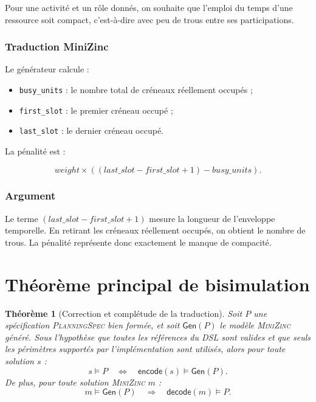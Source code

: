 \documentclass[12pt,a4paper]{article}
\newtheorem{theorem}{Théorème}[section]
\newcommand{\DSL}{\textsc{PlanningSpec}}
\newcommand{\MZN}{\textsc{MiniZinc}}
\newcommand{\encode}{\mathsf{encode}}
\newcommand{\decode}{\mathsf{decode}}
\newcommand{\gen}{\mathsf{Gen}}
\begin{document}
Pour une activité et un rôle donnés, on souhaite que l'emploi du temps d'une ressource soit compact, c'est-à-dire avec peu de trous entre ses participations.

\subsubsection*{Traduction MiniZinc}

Le générateur calcule :

\begin{itemize}[leftmargin=1.2cm]
  \item \texttt{busy\_units} : le nombre total de créneaux réellement occupés ;
  \item \texttt{first\_slot} : le premier créneau occupé ;
  \item \texttt{last\_slot} : le dernier créneau occupé.
\end{itemize}

La pénalité est :

\[
weight \times ((last\_slot - first\_slot + 1) - busy\_units).
\]

\subsubsection*{Argument}

Le terme $(last\_slot - first\_slot + 1)$ mesure la longueur de l'enveloppe temporelle. En retirant les créneaux réellement occupés, on obtient le nombre de trous. La pénalité représente donc exactement le manque de compacité.

\section{Théorème principal de bisimulation}

\begin{theorem}[Correction et complétude de la traduction]
Soit $P$ une spécification \DSL{} bien formée, et soit $\gen(P)$ le modèle \MZN{} généré. Sous l'hypothèse que toutes les références du DSL sont valides et que seuls les périmètres supportés par l'implémentation sont utilisés, alors pour toute solution $s$ :
\[
s \models P \quad \Longleftrightarrow \quad \encode(s) \models \gen(P).
\]
De plus, pour toute solution \MZN{} $m$ :
\[
m \models \gen(P) \quad \Longrightarrow \quad \decode(m) \models P.
\]
\end{theorem}
\end{document}
